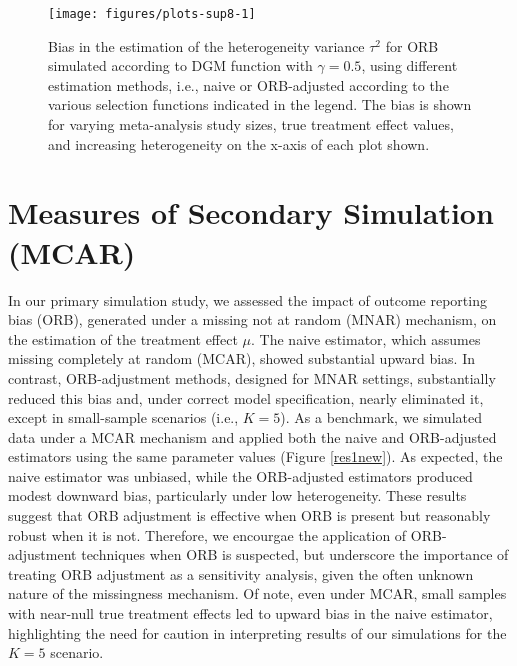 \documentclass{article}\usepackage[]{graphicx}\usepackage[]{xcolor}
\begin{document}
\begin{figure}[!hbt]
\centering
\caption{Bias in the estimation of the heterogeneity variance $\tau^2$ for ORB simulated according to DGM function with $\gamma=0.5$, using different estimation methods, i.e., naive or ORB-adjusted according to the various selection functions indicated in the legend. The bias is shown for varying meta-analysis study sizes, true treatment effect values, and increasing heterogeneity on the x-axis of each plot shown.\\[0.5em]}


{\centering \texttt{[image: figures/plots-sup8-1]} 

}



\label{biastau2}
\end{figure}






\section{Measures of Secondary Simulation (MCAR)}

In our primary simulation study, we assessed the impact of outcome reporting bias (ORB), generated under a missing not at random (MNAR) mechanism, on the estimation of the treatment effect $\mu$. The naive estimator, which assumes missing completely at random (MCAR), showed substantial upward bias. In contrast, ORB-adjustment methods, designed for MNAR settings, substantially reduced this bias and, under correct model specification, nearly eliminated it, except in small-sample scenarios (i.e., $K = 5$). As a benchmark, we simulated data under a MCAR mechanism and applied both the naive and ORB-adjusted estimators using the same parameter values (Figure \ref{res1new}). As expected, the naive estimator was unbiased, while the ORB-adjusted estimators produced modest downward bias, particularly under low heterogeneity. These results suggest that ORB adjustment is effective when ORB is present but reasonably robust when it is not. Therefore, we encourgae the application of ORB-adjustment techniques when ORB is suspected, but underscore the importance of treating ORB adjustment as a sensitivity analysis, given the often unknown nature of the missingness mechanism. Of note, even under MCAR, small samples with near-null true treatment effects led to upward bias in the naive estimator, highlighting the need for caution in interpreting results of our simulations for the $K=5$ scenario.
\end{document}
